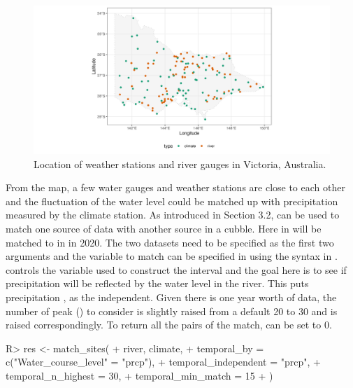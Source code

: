 \documentclass[
]{jss}
\begin{document}
\begin{CodeChunk}
\begin{figure}

{\centering \includegraphics[width=1\linewidth]{figures/matching-map} 

}

\caption[Location of weather stations and river gauges in Victoria, Australia]{Location of weather stations and river gauges in Victoria, Australia.}\label{fig:matching-map}
\end{figure}
\end{CodeChunk}

From the map, a few water gauges and weather stations are close to each
other and the fluctuation of the water level could be matched up with
precipitation measured by the climate station. As introduced in Section
3.2,  can be used to match one source of data with
another source in a cubble. Here  in
 will be matched to  in  in 2020.
The two datasets need to be specified as the first two arguments and the
variable to match can be specified in  using the
 syntax in .  controls
the variable used to construct the interval and the goal here is to see
if precipitation will be reflected by the water level in the river. This
puts precipitation , as the independent. Given there is one
year worth of data, the number of peak () to
consider is slightly raised from a default 20 to 30 and
 is raised correspondingly. To return all the
pairs of the match,  can be set to 0.

\begin{CodeChunk}
\begin{CodeInput}
R> res <- match_sites(
+   river, climate,
+   temporal_by = c("Water_course_level" = "prcp"),
+   temporal_independent = "prcp",  
+   temporal_n_highest = 30,
+   temporal_min_match = 15
+ )
\end{CodeInput}
\end{CodeChunk}
\end{document}
